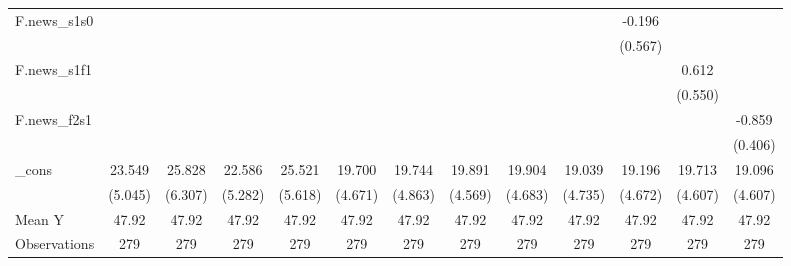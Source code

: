 {\begin{tabular}{l*{12}{c}}
\addlinespace
F.news\_s1s0 &                     &                     &                     &                     &                     &                     &                     &                     &                     &      -0.196         &                     &                     \\
            &                     &                     &                     &                     &                     &                     &                     &                     &                     &     (0.567)         &                     &                     \\
\addlinespace
F.news\_s1f1 &                     &                     &                     &                     &                     &                     &                     &                     &                     &                     &       0.612         &                     \\
            &                     &                     &                     &                     &                     &                     &                     &                     &                     &                     &     (0.550)         &                     \\
\addlinespace
F.news\_f2s1 &                     &                     &                     &                     &                     &                     &                     &                     &                     &                     &                     &      -0.859\sym{*}  \\
            &                     &                     &                     &                     &                     &                     &                     &                     &                     &                     &                     &     (0.406)         \\
\addlinespace
\_cons      &      23.549\sym{***}&      25.828\sym{***}&      22.586\sym{***}&      25.521\sym{***}&      19.700\sym{***}&      19.744\sym{***}&      19.891\sym{***}&      19.904\sym{***}&      19.039\sym{***}&      19.196\sym{***}&      19.713\sym{***}&      19.096\sym{***}\\
            &     (5.045)         &     (6.307)         &     (5.282)         &     (5.618)         &     (4.671)         &     (4.863)         &     (4.569)         &     (4.683)         &     (4.735)         &     (4.672)         &     (4.607)         &     (4.607)         \\
\midrule
Mean Y      &       47.92         &       47.92         &       47.92         &       47.92         &       47.92         &       47.92         &       47.92         &       47.92         &       47.92         &       47.92         &       47.92         &       47.92         \\
Observations&         279         &         279         &         279         &         279         &         279         &         279         &         279         &         279         &         279         &         279         &         279         &         279         \\
\bottomrule
\end{tabular}
}
